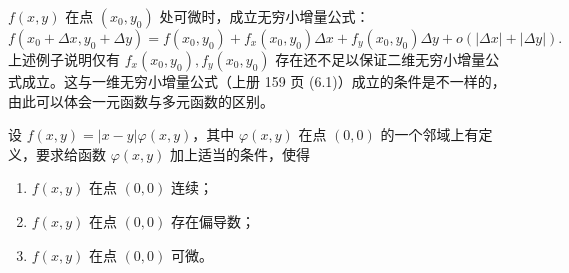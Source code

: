 \begin{xremark}
$f(x,y)$ 在点 $(x_0,y_0)$ 处可微时，成立无穷小增量公式：
\[
  f(x_0+\Delta x,y_0+\Delta y)
  =f(x_0,y_0)+f_x(x_0,y_0)\Delta x+f_y(x_0,y_0)\Delta y
  +o(|\Delta x|+|\Delta y|).
\]
上述例子说明仅有 $f_x(x_0,y_0),f_y(x_0,y_0)$ 存在还不足以保证二维无穷小增量公式成立。这与一维无穷小增量公式（上册 159 页 (6.1)）成立的条件是不一样的，由此可以体会一元函数与多元函数的区别。
\end{xremark}

\begin{xexample}[19.2.3]
设 $f(x,y)=|x-y|\varphi(x,y)$，其中 $\varphi(x,y)$ 在点 $(0,0)$ 的一个邻域上有定义，要求给函数 $\varphi(x,y)$ 加上适当的条件，使得
\begin{enumerate}[label=(\arabic*)]
  \item $f(x,y)$ 在点 $(0,0)$ 连续；
  \item $f(x,y)$ 在点 $(0,0)$ 存在偏导数；
  \item $f(x,y)$ 在点 $(0,0)$ 可微。
\end{enumerate}
\end{xexample}
